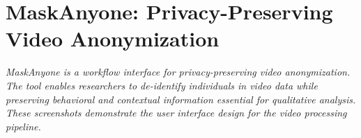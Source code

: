 \documentclass[../main.tex]{subfiles}
\begin{document}
\chapter{MaskAnyone: Privacy-Preserving Video Anonymization}

\begin{fullwidthpar}
\textit{MaskAnyone is a workflow interface for privacy-preserving video anonymization. The tool enables researchers to de-identify individuals in video data while preserving behavioral and contextual information essential for qualitative analysis. These screenshots demonstrate the user interface design for the video processing pipeline.}
\end{fullwidthpar}

\vspace{1cm}








\end{document}
